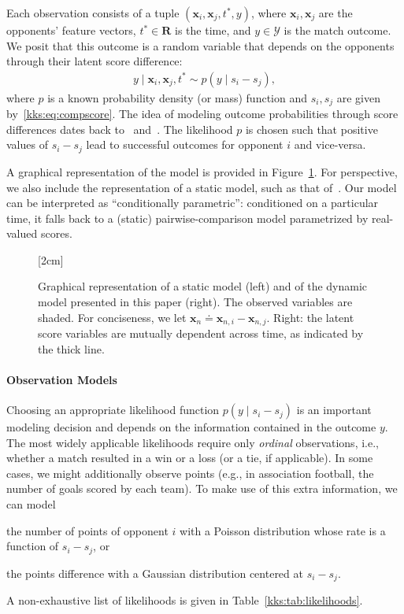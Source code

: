 Each observation consists of a tuple $(\bm{x}_i, \bm{x}_j, t^*, y)$, where $\bm{x}_i, \bm{x}_j$ are the opponents' feature vectors, $t^* \in \mathbf{R}$ is the time, and $y \in \mathcal{Y}$ is the match outcome.
We posit that this outcome is a random variable that depends on the opponents through their latent score difference:
\begin{align*}
	y \mid \bm{x}_i, \bm{x}_j, t^* \sim p( y \mid s_i - s_j ),
\end{align*}
where $p$ is a known probability density (or mass) function and $s_i, s_j$ are given by~\eqref{kks:eq:compscore}.
The idea of modeling outcome probabilities through score differences dates back to~\citet{thurstone1927law} and~\citet{zermelo1928berechnung}.
The likelihood $p$ is chosen such that positive values of $s_i - s_j$ lead to successful outcomes for opponent $i$ and vice-versa.

A graphical representation of the model is provided in Figure~\ref{kks:fig:pgms}.
For perspective, we also include the representation of a static model, such as that of~\citet{thurstone1927law}.
Our model can be interpreted as ``conditionally parametric'': conditioned on a particular time, it falls back to a (static) pairwise-comparison model parametrized by real-valued scores.

\begin{figure}[t]
	[2cm]{
		
	}
	\hfill
	\caption{
		Graphical representation of a static model (left) and of the dynamic model presented in this paper (right).
		The observed variables are shaded.
		For conciseness, we let $\bm{x}_n \doteq \bm{x}_{n,i} - \bm{x}_{n,j}$.
		Right: the latent score variables are mutually dependent across time, as indicated by the thick line.}
	\label{kks:fig:pgms}
\end{figure}

\paragraph{Observation Models}
Choosing an appropriate likelihood function $p(y \mid s_i - s_j)$ is an important modeling decision and depends on the information contained in the outcome $y$.
The most widely applicable likelihoods require only \emph{ordinal} observations, i.e., whether a match resulted in a win or a loss (or a tie, if applicable).
In some cases, we might additionally observe points (e.g., in association football, the number of goals scored by each team).
To make use of this extra information, we can model
\begin{enuminline}
	\item the number of points of opponent $i$ with a Poisson distribution whose rate is a function of $s_i - s_j$, or
	\item the points difference with a Gaussian distribution centered at $s_i - s_j$.
\end{enuminline}
A non-exhaustive list of likelihoods is given in Table~\ref{kks:tab:likelihoods}.

